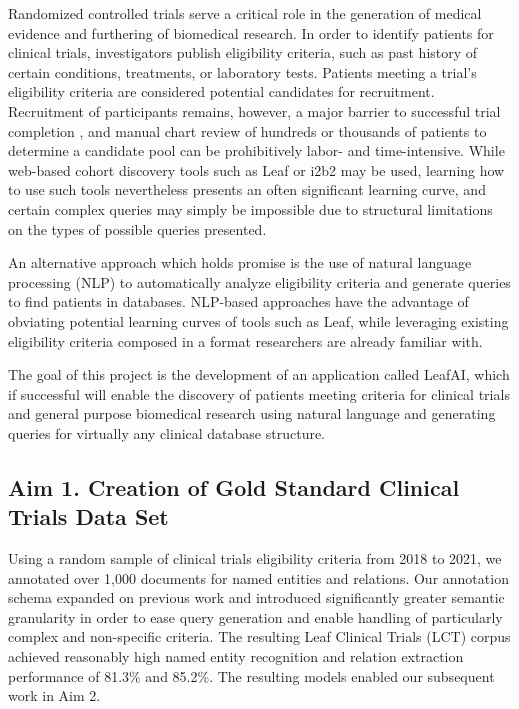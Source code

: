 \documentclass[../main.tex]{subfiles}
\begin{document}
\noindent Randomized controlled trials serve a critical role in the generation of medical evidence and furthering of biomedical research. In order to identify patients for clinical trials, investigators publish eligibility criteria, such as past history of certain conditions, treatments, or laboratory tests. Patients meeting a trial's eligibility criteria are considered potential candidates for recruitment. Recruitment of participants remains, however, a major barrier to successful trial completion \cite{richesson2013electronic}, and manual chart review of hundreds or thousands of patients to determine a candidate pool can be prohibitively labor- and time-intensive. While web-based cohort discovery tools such as Leaf \cite{dobbins2019leaf} or i2b2 \cite{murphy2010serving} may be used, learning how to use such tools nevertheless presents an often significant learning curve, and certain complex queries may simply be impossible due to structural limitations on the types of possible queries presented.

An alternative approach which holds promise is the use of natural language processing (NLP) to automatically analyze eligibility criteria and generate queries to find patients in databases. NLP-based approaches have the advantage of obviating potential learning curves of tools such as Leaf, while leveraging existing eligibility criteria composed in a format researchers are already familiar with.

The goal of this project is the development of an application called LeafAI, which if successful will enable the discovery of patients meeting criteria for clinical trials and general purpose biomedical research using natural language and generating queries for virtually any clinical database structure.

\subsection{Aim 1. Creation of Gold Standard Clinical Trials Data Set}
Using a random sample of clinical trials eligibility criteria from 2018 to 2021, we annotated over 1,000 documents for named entities and relations. Our annotation schema expanded on previous work \cite{kury2020chia, kang2017eliie} and introduced significantly greater semantic granularity in order to ease query generation and enable handling of particularly complex and non-specific criteria. The resulting Leaf Clinical Trials (LCT) corpus achieved reasonably high named entity recognition and relation extraction performance of 81.3\% and 85.2\%. The resulting models enabled our subsequent work in Aim 2.
\end{document}
